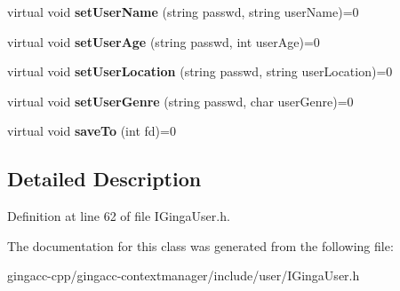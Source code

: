 \begin{CompactItemize}
\item 
virtual void \textbf{setUserName} (string passwd, string userName)=0\label{classbr_1_1pucrio_1_1telemidia_1_1ginga_1_1core_1_1contextmanager_1_1IGingaUser_28eaeccf17b73a733496602cf427f8c8}

\item 
virtual void \textbf{setUserAge} (string passwd, int userAge)=0\label{classbr_1_1pucrio_1_1telemidia_1_1ginga_1_1core_1_1contextmanager_1_1IGingaUser_cfbf37c94106be91964bc19eef518a3e}

\item 
virtual void \textbf{setUserLocation} (string passwd, string userLocation)=0\label{classbr_1_1pucrio_1_1telemidia_1_1ginga_1_1core_1_1contextmanager_1_1IGingaUser_d8dfca48f1357200c5c7549c304638d3}

\item 
virtual void \textbf{setUserGenre} (string passwd, char userGenre)=0\label{classbr_1_1pucrio_1_1telemidia_1_1ginga_1_1core_1_1contextmanager_1_1IGingaUser_e6a127fc9bee9253206f91123c501624}

\item 
virtual void \textbf{saveTo} (int fd)=0\label{classbr_1_1pucrio_1_1telemidia_1_1ginga_1_1core_1_1contextmanager_1_1IGingaUser_318fbf73e23e8f428ca0e3a26f8acd1c}

\end{CompactItemize}


\subsection{Detailed Description}




Definition at line 62 of file IGingaUser.h.

The documentation for this class was generated from the following file:\begin{CompactItemize}
\item 
gingacc-cpp/gingacc-contextmanager/include/user/IGingaUser.h\end{CompactItemize}
